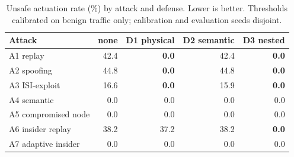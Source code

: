\begin{table}[t]
\centering
\caption{Unsafe actuation rate (\%) by attack and defense. Lower is better. Thresholds calibrated on benign traffic only; calibration and evaluation seeds disjoint.}
\label{tab:defense-comparison}
\begin{tabular}{lrrrr}
\toprule
Attack & none & D1 physical & D2 semantic & D3 nested \\
\midrule
A1 replay & 42.4 & \textbf{0.0} & 42.4 & \textbf{0.0} \\
A2 spoofing & 44.8 & \textbf{0.0} & 44.8 & \textbf{0.0} \\
A3 ISI-exploit & 16.6 & \textbf{0.0} & 15.9 & \textbf{0.0} \\
A4 semantic & 0.0 & 0.0 & 0.0 & 0.0 \\
A5 compromised node & 0.0 & 0.0 & 0.0 & 0.0 \\
A6 insider replay & 38.2 & 37.2 & 38.2 & \textbf{0.0} \\
A7 adaptive insider & 0.0 & 0.0 & 0.0 & 0.0 \\
\bottomrule
\end{tabular}
\end{table}
